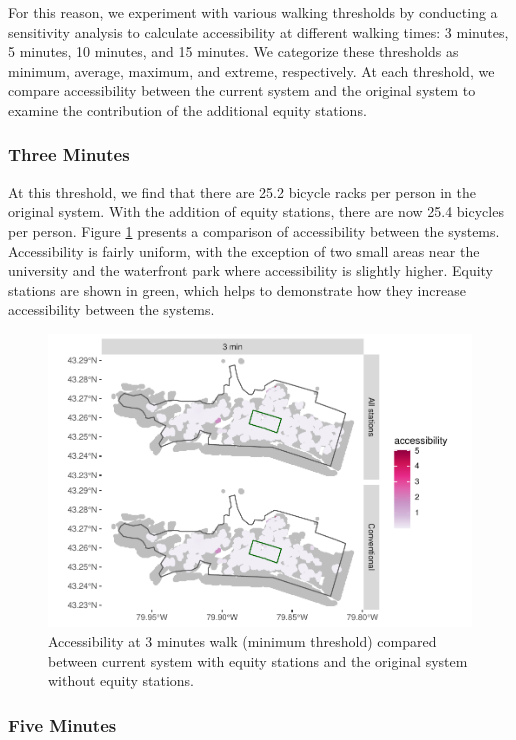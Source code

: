 \documentclass[]{elsarticle} %
\begin{document}
For this reason, we experiment with various walking thresholds by
conducting a sensitivity analysis to calculate accessibility at
different walking times: 3 minutes, 5 minutes, 10 minutes, and 15
minutes. We categorize these thresholds as minimum, average, maximum,
and extreme, respectively. At each threshold, we compare accessibility
between the current system and the original system to examine the
contribution of the additional equity stations.

\hypertarget{three-minutes}{%
\subsubsection{Three Minutes}\label{three-minutes}}

At this threshold, we find that there are 25.2 bicycle racks per person
in the original system. With the addition of equity stations, there are
now 25.4 bicycles per person. Figure \ref{fig:figure-6} presents a
comparison of accessibility between the systems. Accessibility is fairly
uniform, with the exception of two small areas near the university and
the waterfront park where accessibility is slightly higher. Equity
stations are shown in green, which helps to demonstrate how they
increase accessibility between the systems.

\begin{figure}

{\centering \includegraphics[width=0.65\linewidth]{Bike-share-spatial-equity_files/figure-latex/figure-6-1} 

}

\caption{Accessibility at 3 minutes walk (minimum threshold) compared between current system with equity stations and the original system without equity stations.}\label{fig:figure-6}
\end{figure}

\hypertarget{five-minutes}{%
\subsubsection{Five Minutes}\label{five-minutes}}
\end{document}
